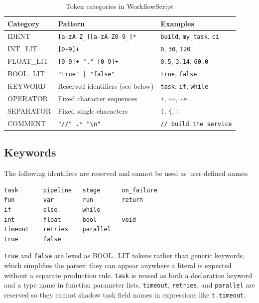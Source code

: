 \documentclass[10pt,a4paper]{article}
\begin{document}
\begin{table}[h!]
\centering
\begin{tabular}{@{}lll@{}}
\toprule
\textbf{Category} & \textbf{Pattern} & \textbf{Examples} \\
\midrule
IDENT      & \texttt{[a-zA-Z\_][a-zA-Z0-9\_]*}     & \texttt{build}, \texttt{my\_task}, \texttt{ci} \\
INT\_LIT   & \texttt{[0-9]+}                         & \texttt{0}, \texttt{30}, \texttt{120} \\
FLOAT\_LIT & \texttt{[0-9]+ "." [0-9]+}             & \texttt{0.5}, \texttt{3.14}, \texttt{60.0} \\
BOOL\_LIT  & \texttt{"true" | "false"}               & \texttt{true}, \texttt{false} \\
KEYWORD    & Reserved identifiers (see below)        & \texttt{task}, \texttt{if}, \texttt{while} \\
OPERATOR   & Fixed character sequences               & \texttt{+}, \texttt{==}, \texttt{->} \\
SEPARATOR  & Fixed single characters                 & \texttt{(}, \texttt{\{}, \texttt{:} \\
COMMENT    & \texttt{"//" .* "{\textbackslash}n"}    & \texttt{// build the service} \\
\bottomrule
\end{tabular}
\caption{Token categories in WorkflowScript}
\end{table}

\subsection{Keywords}

The following identifiers are reserved and cannot be used as
user-defined names:

\begin{lstlisting}[language={}, frame=none, basicstyle=\ttfamily\small]
task       pipeline   stage      on_failure
fun        var        run        return
if         else       while
int        float      bool       void
timeout    retries    parallel
true       false
\end{lstlisting}

\texttt{true} and \texttt{false} are lexed as BOOL\_LIT tokens rather
than generic keywords, which simplifies the parser: they can appear
anywhere a literal is expected without a separate production rule.
\texttt{task} is reused as both a declaration keyword and a type name in
function parameter lists. \texttt{timeout}, \texttt{retries}, and
\texttt{parallel} are reserved so they cannot shadow task field names in
expressions like \texttt{t.timeout}.
\end{document}
